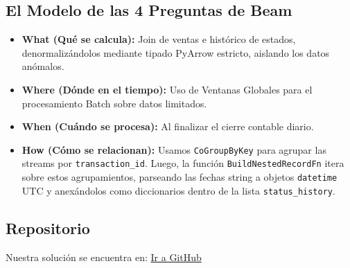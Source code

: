 \documentclass[11pt,a4paper]{article}
\begin{document}
\subsection{El Modelo de las 4 Preguntas de Beam}
\begin{itemize}
    \item \textbf{What (Qué se calcula):} Join de ventas e histórico de estados, denormalizándolos mediante tipado PyArrow estricto, aislando los datos anómalos.
    \item \textbf{Where (Dónde en el tiempo):} Uso de Ventanas Globales para el procesamiento Batch sobre datos limitados.
    \item \textbf{When (Cuándo se procesa):} Al finalizar el cierre contable diario.
    \item \textbf{How (Cómo se relacionan):} Usamos \texttt{CoGroupByKey} para agrupar las streams por \texttt{transaction\_id}. Luego, la función \texttt{BuildNestedRecordFn} itera sobre estos agrupamientos, parseando las fechas string a objetos \texttt{datetime} UTC y anexándolos como diccionarios dentro de la lista \texttt{status\_history}.
\end{itemize}

\subsection{Repositorio}
Nuestra solución se encuentra en:
\href{https://github.com/trencitos/PROYECTO_BD_A_GRAN_ESCALA.git}{Ir a GitHub}
\end{document}
